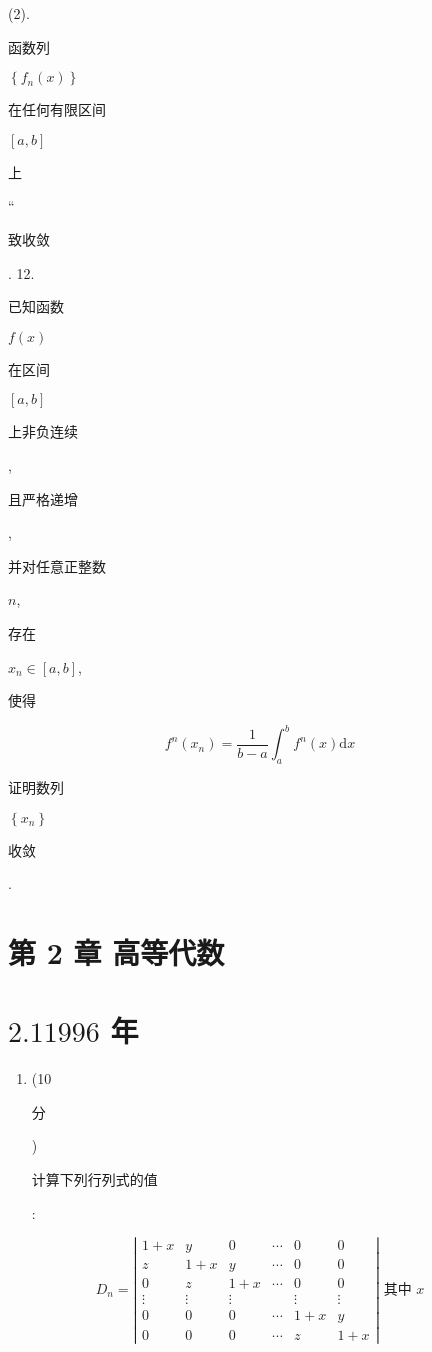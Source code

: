\documentclass[10pt]{article}
\begin{document}
(2). \begin{CJK}{UTF8}{mj}函数列\end{CJK} $\left\{f_{n}(x)\right\}$ \begin{CJK}{UTF8}{mj}在任何有限区间\end{CJK} $[a, b]$ \begin{CJK}{UTF8}{mj}上\end{CJK}“\begin{CJK}{UTF8}{mj}致收敛\end{CJK}. 12. \begin{CJK}{UTF8}{mj}已知函数\end{CJK} $f(x)$ \begin{CJK}{UTF8}{mj}在区间\end{CJK} $[a, b]$ \begin{CJK}{UTF8}{mj}上非负连续\end{CJK}, \begin{CJK}{UTF8}{mj}且严格递增\end{CJK}, \begin{CJK}{UTF8}{mj}并对任意正整数\end{CJK} $n$, \begin{CJK}{UTF8}{mj}存在\end{CJK} $x_{n} \in[a, b]$, \begin{CJK}{UTF8}{mj}使得\end{CJK}
$$
f^{n}\left(x_{n}\right)=\frac{1}{b-a} \int_{a}^{b} f^{n}(x) \mathrm{d} x
$$
\begin{CJK}{UTF8}{mj}证明数列\end{CJK} $\left\{x_{n}\right\}$ \begin{CJK}{UTF8}{mj}收敛\end{CJK}.

\section{第 2 章 高等代数}
\section{$2.11996$ 年}
\begin{enumerate}
  \item (10 \begin{CJK}{UTF8}{mj}分\end{CJK}) \begin{CJK}{UTF8}{mj}计算下列行列式的值\end{CJK}:
\end{enumerate}
$$
D_{n}=\left|\begin{array}{cccccc}
1+x & y & 0 & \cdots & 0 & 0 \\
z & 1+x & y & \cdots & 0 & 0 \\
0 & z & 1+x & \cdots & 0 & 0 \\
\vdots & \vdots & \vdots & & \vdots & \vdots \\
0 & 0 & 0 & \cdots & 1+x & y \\
0 & 0 & 0 & \cdots & z & 1+x
\end{array}\right| \text { 其中 } x
$$
\end{document}
